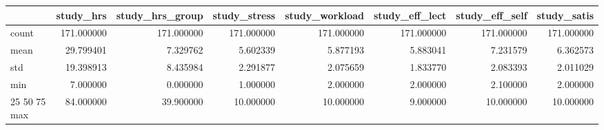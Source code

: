 \begin{tabular}{lrrrrrrr}
\toprule
 & study_hrs & study_hrs_group & study_stress & study_workload & study_eff_lect & study_eff_self & study_satis \\
\midrule
count & 171.000000 & 171.000000 & 171.000000 & 171.000000 & 171.000000 & 171.000000 & 171.000000 \\
mean & 29.799401 & 7.329762 & 5.602339 & 5.877193 & 5.883041 & 7.231579 & 6.362573 \\
std & 19.398913 & 8.435984 & 2.291877 & 2.075659 & 1.833770 & 2.083393 & 2.011029 \\
min & 7.000000 & 0.000000 & 1.000000 & 2.000000 & 2.000000 & 2.100000 & 2.000000 \\
25%
50%
75%
max & 84.000000 & 39.900000 & 10.000000 & 10.000000 & 9.000000 & 10.000000 & 10.000000 \\
\bottomrule
\end{tabular}
